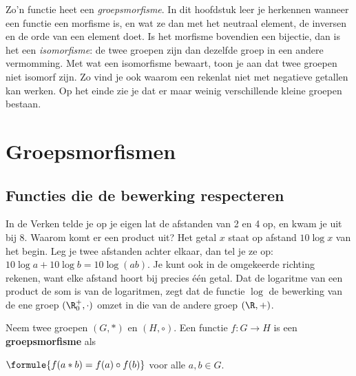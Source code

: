 Zo'n functie heet een \textit{groepsmorfisme}. In dit hoofdstuk leer je herkennen wanneer een functie een morfisme is, en wat ze dan met het neutraal element, de inversen en de orde van een element doet. Is het morfisme bovendien een bijectie, dan is het een \textit{isomorfisme}: de twee groepen zijn dan dezelfde groep in een andere vermomming. Met wat een isomorfisme bewaart, toon je aan dat twee groepen niet isomorf zijn. Zo vind je ook waarom een rekenlat niet met negatieve getallen kan werken. Op het einde zie je dat er maar weinig verschillende kleine groepen bestaan.

\begin{oefeningen}[Start]

\end{oefeningen}


\section{Groepsmorfismen}

\subsection{Functies die de bewerking respecteren}

In de Verken telde je op je eigen lat de afstanden van 2 en 4 op, en kwam je uit bij 8. Waarom komt er een product uit? Het getal $x$ staat op afstand $10 \log x$ van het begin. Leg je twee afstanden achter elkaar, dan tel je ze op: $10 \log a + 10 \log b = 10 \log(ab)$. Je kunt ook in de omgekeerde richting rekenen, want elke afstand hoort bij precies één getal. Dat de logaritme van een product de som is van de logaritmen, zegt dat de functie $\log$ de bewerking van de ene groep $(\R^+_0, \cdot)$ omzet in die van de andere groep $(\R, +)$.

\begin{theorie}
Neem twee groepen $(G, \ast)$ en $(H, \circ)$. Een functie $f \colon G \to H$ is een \textbf{\textcolor{accent}{groepsmorfisme}} als

\vspace{1mm}
\qquad $\formule{f(a \ast b) = f(a) \circ f(b)}$ \qquad voor alle $a, b \in G$.
\end{theorie}

